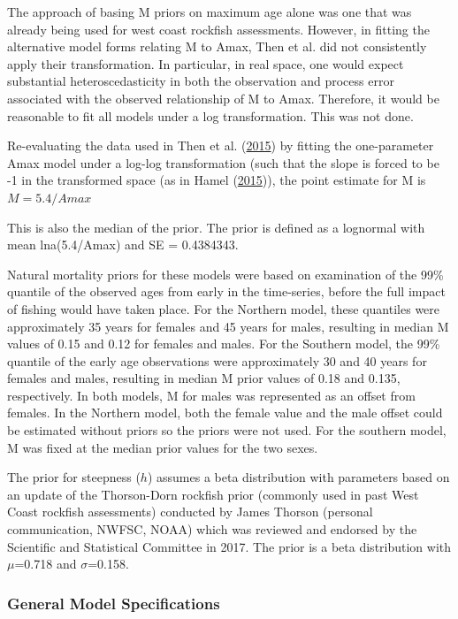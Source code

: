 \documentclass[12pt,]{article}
\begin{document}
The approach of basing M priors on maximum age alone was one that was
already being used for west coast rockfish assessments. However, in
fitting the alternative model forms relating M to Amax, Then et al. did
not consistently apply their transformation. In particular, in real
space, one would expect substantial heteroscedasticity in both the
observation and process error associated with the observed relationship
of M to Amax. Therefore, it would be reasonable to fit all models under
a log transformation. This was not done.

Re-evaluating the data used in Then et al.
(\protect\hyperlink{ref-Then2015}{2015}) by fitting the one-parameter
Amax model under a log-log transformation (such that the slope is forced
to be -1 in the transformed space (as in Hamel
(\protect\hyperlink{ref-Hamel2015}{2015})), the point estimate for M is
\(M=5.4/Amax\)

This is also the median of the prior. The prior is defined as a
lognormal with mean lna(5.4/Amax) and SE = 0.4384343.

Natural mortality priors for these models were based on examination of
the 99\% quantile of the observed ages from early in the time-series,
before the full impact of fishing would have taken place. For the
Northern model, these quantiles were approximately 35 years for females
and 45 years for males, resulting in median M values of 0.15 and 0.12
for females and males. For the Southern model, the 99\% quantile of the
early age observations were approximately 30 and 40 years for females
and males, resulting in median M prior values of 0.18 and 0.135,
respectively. In both models, M for males was represented as an offset
from females. In the Northern model, both the female value and the male
offset could be estimated without priors so the priors were not used.
For the southern model, M was fixed at the median prior values for the
two sexes.

The prior for steepness (\(h\)) assumes a beta distribution with
parameters based on an update of the Thorson-Dorn rockfish prior
(commonly used in past West Coast rockfish assessments) conducted by
James Thorson (personal communication, NWFSC, NOAA) which was reviewed
and endorsed by the Scientific and Statistical Committee in 2017. The
prior is a beta distribution with \(\mu\)=0.718 and \(\sigma\)=0.158.

\subsubsection{General Model
Specifications}\label{general-model-specifications}
\end{document}
